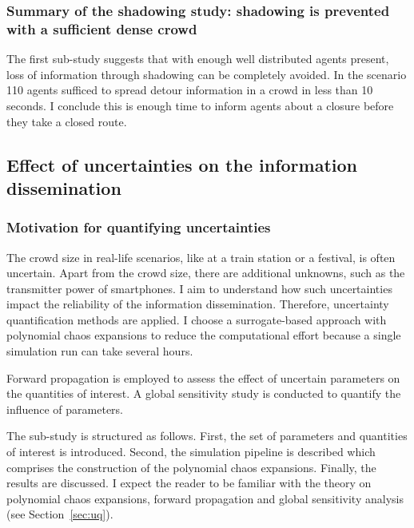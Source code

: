 \subsubsection{Summary of the shadowing study: shadowing is prevented with a sufficient dense crowd}
The first sub-study suggests that with enough well distributed agents present, loss of information through shadowing can be completely avoided. In the scenario 110 agents sufficed to spread detour information in a crowd in less than 10 seconds. I conclude this is enough time to inform agents about a closure before they take a closed route.



\subsection{Effect of uncertainties on the information dissemination}

\subsubsection{Motivation for quantifying uncertainties}


The crowd size in real-life scenarios, like at a train station or a festival, is often uncertain. Apart from the crowd size, there are additional unknowns, such as the transmitter power of smartphones. I aim to understand how such uncertainties impact the reliability of the information dissemination. 
Therefore, uncertainty quantification methods are applied. I choose a surrogate-based approach with polynomial chaos expansions to reduce the computational effort because a single simulation run can take several hours.

Forward propagation is employed to assess the effect of uncertain parameters on the quantities of interest. A global sensitivity study is conducted to quantify the influence of parameters.

The sub-study is structured as follows. First, the set of parameters and quantities of interest is introduced. Second, the simulation pipeline is described which comprises the construction of the polynomial chaos expansions. Finally, the results are discussed. I expect the reader to be familiar with the theory on polynomial chaos expansions, forward propagation and global sensitivity analysis (see Section~\ref{sec:uq}).


